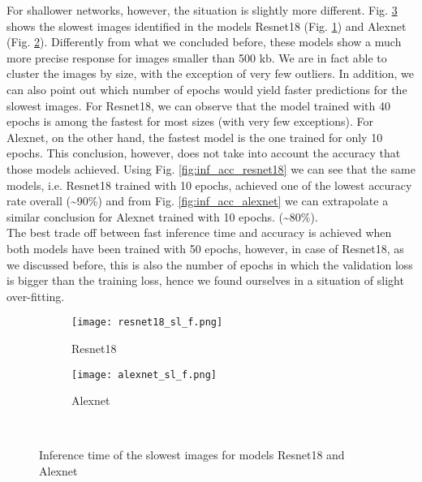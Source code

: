 For shallower networks, however, the situation is slightly more different. Fig. \ref{fig:sl_f_shallow} shows the slowest images identified in the models Resnet18 (Fig. \ref{fig:resnet18_sl_f}) and Alexnet (Fig. \ref{fig:alexnet_sl_f}). Differently from what we concluded before, these models show a much more precise response for images smaller than 500 kb. We are in fact able to cluster the images by size, with the exception of very few outliers. In addition, we can also point out which number of epochs would yield faster predictions for the slowest images. For Resnet18, we can observe that the model trained with 40 epochs is among the fastest for most sizes (with very few exceptions). For Alexnet, on the other hand, the fastest model is the one trained for only 10 epochs. This conclusion, however, does not take into account the accuracy that those models achieved. Using Fig. \ref{fig:inf_acc_resnet18} we can see that the same models, i.e. Resnet18 trained with 10 epochs, achieved one of the lowest accuracy rate overall (\textasciitilde90\%) and from Fig. \ref{fig:inf_acc_alexnet} we can extrapolate a similar conclusion for Alexnet trained with 10 epochs. (\textasciitilde80\%). \\
The best trade off between fast inference time and accuracy is achieved when both models have been trained with 50 epochs, however, in case of Resnet18, as we discussed before, this is also the number of epochs in which the validation loss is bigger than the training loss, hence we found ourselves in a situation of slight over-fitting. \\
\begin{figure}[h]
     \begin{subfigure}{0.5\textwidth}
	    \texttt{[image: resnet18\_sl\_f.png]}
	    \caption{Resnet18}
         \label{fig:resnet18_sl_f}
         
     \end{subfigure}
     \hfill
     \begin{subfigure}{0.5\textwidth}
	    \texttt{[image: alexnet\_sl\_f.png]}
	    \caption{Alexnet}
        \label{fig:alexnet_sl_f}
        
     \end{subfigure}\\
     \caption{Inference time of the slowest images for models Resnet18 and Alexnet}
        \label{fig:sl_f_shallow}
\end{figure}

